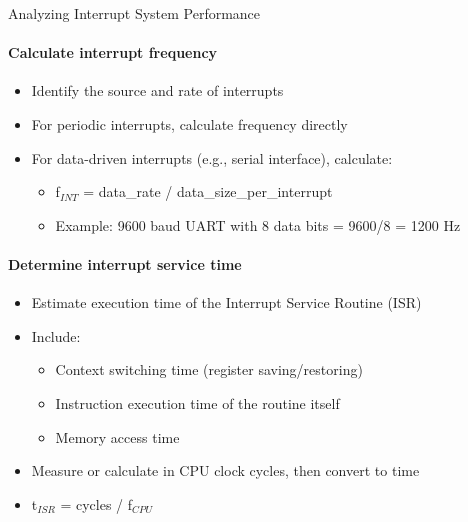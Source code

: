 \begin{KR}{Analyzing Interrupt System Performance}
\paragraph{Calculate interrupt frequency}
\begin{itemize}
    \item Identify the source and rate of interrupts
    \item For periodic interrupts, calculate frequency directly
    \item For data-driven interrupts (e.g., serial interface), calculate:
    \begin{itemize}
        \item f$_{INT}$ = data\_rate / data\_size\_per\_interrupt
        \item Example: 9600 baud UART with 8 data bits = 9600/8 = 1200 Hz
    \end{itemize}
\end{itemize}

\paragraph{Determine interrupt service time}
\begin{itemize}
    \item Estimate execution time of the Interrupt Service Routine (ISR)
    \item Include:
    \begin{itemize}
        \item Context switching time (register saving/restoring)
        \item Instruction execution time of the routine itself
        \item Memory access time
    \end{itemize}
    \item Measure or calculate in CPU clock cycles, then convert to time
    \item t$_{ISR}$ = cycles / f$_{CPU}$
\end{itemize}


\end{KR}
